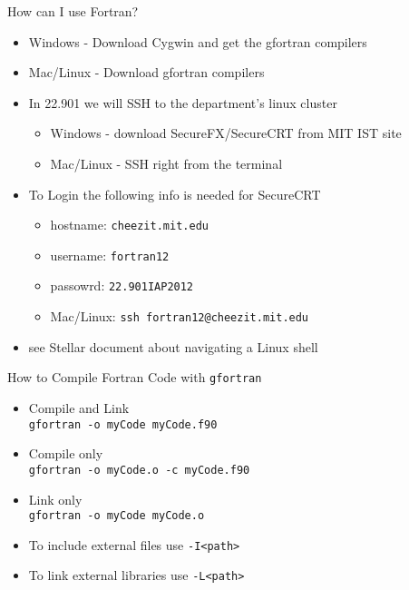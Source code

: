 \documentclass{beamer}
\begin{document}
\begin{frame}{How can I use Fortran?}
\begin{itemize}
 
  \item Windows - Download Cygwin and get the gfortran compilers
  \vfill\item Mac/Linux - Download gfortran compilers
  \vfill\item In 22.901 we will SSH to the department's linux cluster
  \begin{itemize}
    \item Windows - download SecureFX/SecureCRT from MIT IST site
    \item Mac/Linux - SSH right from the terminal
  \end{itemize}
  \vfill\item To Login the following info is needed for SecureCRT
  \begin{itemize}
    \item hostname: \texttt{cheezit.mit.edu}
    \item username: \texttt{fortran12}
    \item passowrd: \texttt{22.901IAP2012}
    \item Mac/Linux: \texttt{ssh fortran12@cheezit.mit.edu}
  \end{itemize}
  \vfill\item see Stellar document about navigating a Linux shell
\end{itemize}
\end{frame}
\begin{frame}{How to Compile Fortran Code with \texttt{gfortran}}
  \begin{itemize}
    \item Compile and Link \\
      \texttt{gfortran -o myCode myCode.f90}
    \vfill\item Compile only\\
      \texttt{gfortran -o myCode.o -c myCode.f90}
    \vfill\item Link only\\
      \texttt{gfortran -o myCode myCode.o}
    \vfill\item To include external files use \texttt{-I<path>}
    \vfill\item To link external libraries use \texttt{-L<path>}
  \end{itemize}
\end{frame}
\end{document}
